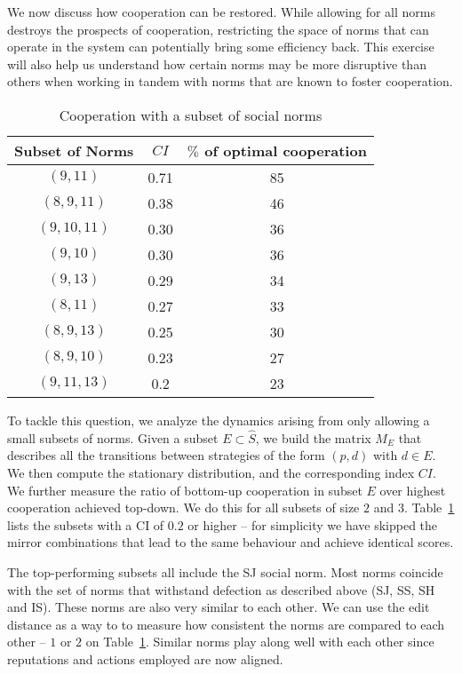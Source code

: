 \documentclass[sigconf]{aamas}  %
\begin{document}
We now discuss how cooperation can be restored. While allowing for all norms destroys the prospects of cooperation, restricting the space of norms that can operate in the system can potentially bring some efficiency back. This exercise will also help us understand how certain norms may be more disruptive than others when working in tandem with norms that are known to foster cooperation.

 \begin{table}[b]
   \caption{Cooperation with a subset of social norms \label{table1}}
   \begin{tabular}{ccc}
     \toprule
     Subset of Norms & $CI$ & $\%$ of optimal cooperation\\
     \midrule
     $(9, 11)$ & 0.71 & 85\\
     $(8, 9, 11)$ & 0.38 & 46\\
     $(9, 10, 11)$ & 0.30 & 36 \\
     $(9, 10)$ & 0.30 & 36 \\
     $(9, 13)$ & 0.29 & 34\\
     $(8, 11)$ & 0.27 & 33\\
     $(8, 9, 13)$ & 0.25 & 30\\
     $(8, 9, 10)$ & 0.23 & 27\\
     $(9, 11, 13)$ & 0.2 & 23\\
   \bottomrule
 \end{tabular}
 \end{table}
 

To tackle this question, we analyze the dynamics arising from only allowing a small subsets of norms. Given a subset $E \subset \hat{S}$, we build the matrix $M_E$ that describes all the transitions between strategies of the form $(p, d)$ with $d \in E$. We then compute the stationary distribution, and the corresponding index $CI$. We further measure the ratio of bottom-up cooperation in subset $E$ over highest cooperation achieved top-down. We do this for all subsets of size $2$ and $3$. Table~\ref{table1} lists the subsets with a CI of $0.2$ or higher -- for simplicity we have skipped the mirror combinations that lead to the same behaviour and achieve identical scores.

The top-performing subsets all include the SJ social norm. Most norms coincide with the set of norms that withstand defection as described above (SJ, SS, SH and IS). These norms are also very similar to each other. We can use the edit distance as a way to to measure how consistent the norms are compared to each other -- $1$ or $2$ on Table~\ref{table1}. Similar norms play along well with each other since reputations and actions employed are now aligned.
\end{document}
